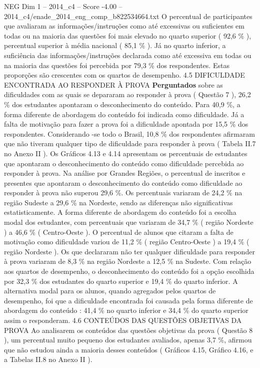 \begin{textsample}{NEG Dim 1 – 2014\_c4 – Score -4.00 – 2014\_c4/enade\_2014\_eng\_comp\_b822534664.txt}
O percentual de participantes que avaliaram as informações/instruções como até excessivas ou suficientes em todas ou na maioria das questões foi mais elevado no quarto superior ( 92,6 \% ), percentual superior à média nacional ( 85,1 \% ).
Já no quarto inferior, a suficiência das informações/instruções declarada como até excessiva em todas ou na maioria das questões foi percebida por 79,3 \% dos respondentes.
Estas proporções são crescentes com os quartos de desempenho. 4.5 DIFICULDADE ENCONTRADA AO RESPONDER À PROVA \textbf{Perguntados} sobre as dificuldades com as quais se depararam ao responder à prova ( Questão 7 ), 26,2 \% dos estudantes apontaram o desconhecimento do conteúdo.
Para 40,9 \%, a forma diferente de abordagem do conteúdo foi indicada como dificuldade.
Já a falta de motivação para fazer a prova foi a dificuldade apontada por 15,5 \% dos respondentes.
Considerando -se todo o Brasil, 10,8 \% dos respondentes afirmaram que não tiveram qualquer tipo de dificuldade para responder à prova ( Tabela II.7 no Anexo II ).
Os Gráficos 4.13 e 4.14 apresentam os percentuais de estudantes que apontaram o desconhecimento do conteúdo como dificuldade percebida ao responder à prova.
Na análise por Grandes Regiões, o percentual de inscritos e presentes que apontaram o desconhecimento do conteúdo como dificuldade ao responder à prova não superou 29,6 \%.
Os percentuais variaram de 24,2 \% na região Sudeste a 29,6 \% na Nordeste, sendo as diferenças não significativas estatisticamente.
A forma diferente de abordagem do conteúdo foi a escolha modal dos estudantes, com percentuais que variaram de 34,7 \% ( região Nordeste ) a 46,6 \% ( Centro-Oeste ).
O percentual de alunos que citaram a falta de motivação como dificuldade variou de 11,2 \% ( região Centro-Oeste ) a 19,4 \% ( região Nordeste ).
Os que declararam não ter qualquer dificuldade para responder à prova variaram de 8,3 \% na região Nordeste a 12,5 \% na Sudeste.
Com relação aos quartos de desempenho, o desconhecimento do conteúdo foi a opção escolhida por 32,3 \% dos estudantes do quarto superior e 19,4 \% do quarto inferior.
A alternativa modal para os alunos, quando agregados pelos quartos de desempenho, foi que a dificuldade encontrada foi causada pela forma diferente de abordagem do conteúdo : 41,4 \% no quarto inferior e 34,4 \% do quarto superior assim o responderam. 4.6 CONTEÚDOS DAS QUESTÕES OBJETIVAS DA PROVA Ao analisarem os conteúdos das questões objetivas da prova ( Questão 8 ), um percentual muito pequeno dos estudantes avaliados, apenas 3,7 \%, afirmou que não estudou ainda a maioria desses conteúdos ( Gráficos 4.15, Gráfico 4.16, e a Tabelas II.8 no Anexo II ).

\end{textsample}
